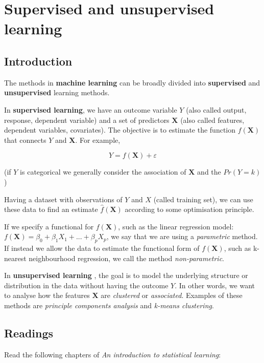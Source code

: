 \documentclass[
]{book}
\begin{document}
\chapter{Supervised and unsupervised learning}\label{supervised-and-unsupervised-learning}

\section{Introduction}\label{introduction}

The methods in \textbf{machine learning} can be broadly divided into \textbf{supervised} and
\textbf{unsupervised} learning methods.

In \textbf{supervised learning}, we have an outcome variable \(Y\) (also called output,
response, dependent variable) and a set of predictors \(\mathbf{X}\) (also called
features, dependent variables, covariates). The objective is to estimate
the function \(f(\mathbf{X})\) that connects \(Y\) and \(\mathbf{X}\). For example,

\[
Y = f(\mathbf{X}) + \varepsilon
\]

(if \(Y\) is categorical we generally consider the association of \(\mathbf{X}\) and
the \(Pr(Y=k)\))

Having a dataset with observations of \(Y\) and \(X\) (called training set), we can
use these data to find an estimate \(\hat f(\mathbf{X})\) according to some
optimisation principle.

If we specify a functional for \(f(\mathbf{X})\), such as the linear regression
model:\(f(\mathbf{X}) = \beta_0 + \beta_1X_1 + ... + \beta_p X_p\), we say that
we are using a \emph{parametric} method. If instead we allow the data to estimate
the functional form of \(f(\mathbf{X})\), such as k-nearest neighbourhood
regression, we call the method \emph{non-parametric}.

In \textbf{unsupervised learning} , the goal is to model the
underlying structure or distribution in the data without having the outcome \(Y\).
In other words, we want to analyse how the features \(\mathbf{X}\) are \emph{clustered}
or \emph{associated}. Examples of these methods are \emph{principle components analysis}
and \emph{k-means clustering}.

\section{Readings}\label{readings}

Read the following chapters of \emph{An introduction to statistical learning}:
\end{document}

